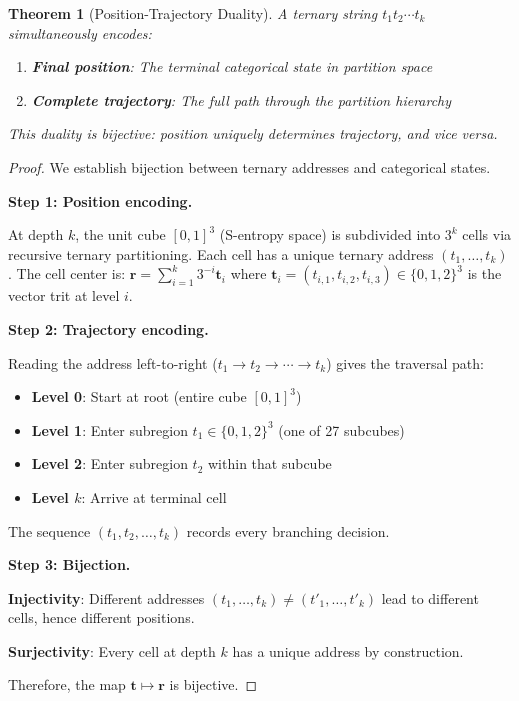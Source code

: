 \documentclass[twocolumn,10pt]{article}
\newtheorem{theorem}{Theorem}[section]
\begin{document}
\begin{theorem}[Position-Trajectory Duality]
\label{thm:duality}
A ternary string $t_1 t_2 \cdots t_k$ simultaneously encodes:
\begin{enumerate}
    \item \textbf{Final position}: The terminal categorical state in partition space
    \item \textbf{Complete trajectory}: The full path through the partition hierarchy
\end{enumerate}
This duality is bijective: position uniquely determines trajectory, and vice versa.
\end{theorem}



\begin{proof}
We establish bijection between ternary addresses and categorical states.

\textbf{Step 1: Position encoding.}

At depth $k$, the unit cube $[0,1]^3$ (S-entropy space) is subdivided into $3^k$ cells via recursive ternary partitioning. Each cell has a unique ternary address $(t_1, \ldots, t_k)$. The cell center is:
$
\mathbf{r} = \sum_{i=1}^{k} 3^{-i} \mathbf{t}_i
$
where $\mathbf{t}_i = (t_{i,1}, t_{i,2}, t_{i,3}) \in \{0, 1, 2\}^3$ is the vector trit at level $i$.

\textbf{Step 2: Trajectory encoding.}

Reading the address left-to-right ($t_1 \to t_2 \to \cdots \to t_k$) gives the traversal path:
\begin{itemize}
    \item \textbf{Level 0}: Start at root (entire cube $[0,1]^3$)
    \item \textbf{Level 1}: Enter subregion $t_1 \in \{0, 1, 2\}^3$ (one of 27 subcubes)
    \item \textbf{Level 2}: Enter subregion $t_2$ within that subcube
    \item \textbf{Level $k$}: Arrive at terminal cell
\end{itemize}
The sequence $(t_1, t_2, \ldots, t_k)$ records every branching decision.

\textbf{Step 3: Bijection.}

\textbf{Injectivity}: Different addresses $(t_1, \ldots, t_k) \neq (t'_1, \ldots, t'_k)$ lead to different cells, hence different positions.

\textbf{Surjectivity}: Every cell at depth $k$ has a unique address by construction.

Therefore, the map $\mathbf{t} \mapsto \mathbf{r}$ is bijective.
\end{proof}
\end{document}

